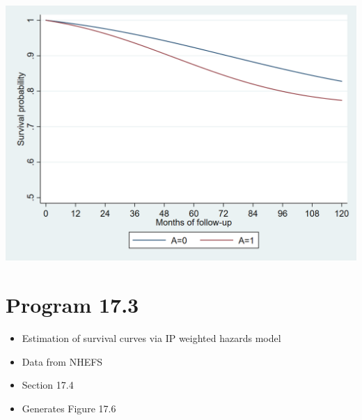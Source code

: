 \documentclass[
  10pt,
]{book}
\providecommand{\tightlist}{%
  \setlength{\itemsep}{0pt}\setlength{\parskip}{0pt}}
\begin{document}
\begin{center}\includegraphics[width=0.85\linewidth]{./figs/stata-fig-17-2} \end{center}

\hypertarget{program-17.3-1}{%
\section{Program 17.3}\label{program-17.3-1}}

\begin{itemize}
\tightlist
\item
  Estimation of survival curves via IP weighted hazards model
\item
  Data from NHEFS
\item
  Section 17.4
\item
  Generates Figure 17.6
\end{itemize}
\end{document}
